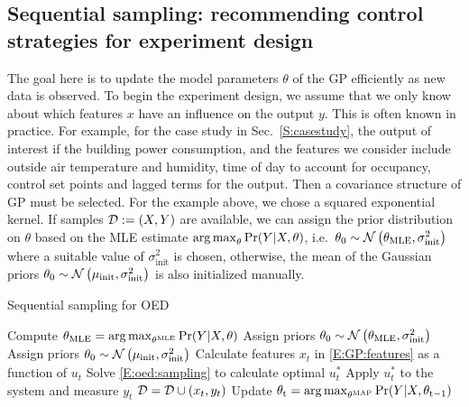 \subsection{Sequential sampling: recommending control strategies for experiment design }

The goal here is to update the model parameters \(\theta\) of the GP efficiently as new data is observed. 
To begin the experiment design, we assume that we only know about which features \(x\) have an influence on the output \(y\). This is often known in practice. For example, for the case study in Sec.~\ref{S:casestudy}, the output of interest if the building power consumption, and the features we consider include outside air temperature and humidity, time of day to account for occupancy, control set points and lagged terms for the output. Then a covariance structure of GP must be selected. For the example above, we chose a squared exponential kernel.
If samples \(\mathcal{D} := (X,Y)\) are available, we can assign the prior distribution on \(\theta\) based on the MLE estimate \( \operatorname*{arg\,max}_\theta \Pr(Y \vert X, \theta)\), i.e.~\(\theta_{\mathrm{0}} \sim \operatorname*{\mathcal{N}}\left(\theta_{\mathrm{MLE}}, \sigma^2_{\mathrm{init}}\right)\) where a suitable value of \(\sigma^2_{\mathrm{init}}\) is chosen, otherwise, the mean of the Gaussian priors \(\theta_{\mathrm{0}} \sim \operatorname*{\mathcal{N}}\left(\mu_{\mathrm{{init}}}, \sigma^2_\mathrm{init}\right)\) is also initialized manually.

\begin{algorithm}[!tb]
	\caption{Sequential sampling for OED}
	\label{A:oed:sequential}
	\begin{algorithmic}[1]
		\State Compute \( \theta_{\mathrm{MLE}} = \operatorname*{arg\,max}_{\theta^{\mathrm{MLE}}} \Pr(Y \vert X, \theta)\)
		\State Assign priors \(\theta_{\mathrm{0}} \sim \operatorname*{\mathcal{N}}\left(\theta_{\mathrm{MLE}}, \sigma^2_{\mathrm{init}}\right)\)
		\Else 
		\State Assign priors \(\theta_{\mathrm{0}} \sim \operatorname*{\mathcal{N}}\left(\mu_{\mathrm{{init}}}, \sigma^2_\mathrm{init}\right)\)
		\EndIf
		\EndProcedure
		\State Calculate features \(x_t\) in \eqref{E:GP:features} as a function of \(u_t\)
		\State Solve \eqref{E:oed:sampling} to calculate optimal \(u^*_t\)
		\State Apply \(u^*_t\) to the system and measure \(y_t\)
		\State \(\mathcal{D} = \mathcal{D} \cup (x_t,y_t) \)
		\State Update \( \theta_{\mathrm{t}} = \operatorname*{arg\,max}_{\theta^{\mathrm{MAP}}} \Pr(Y \vert X, \theta_{\mathrm{t-1}})\)
		\EndWhile
		\EndProcedure
	\end{algorithmic}
\end{algorithm}

